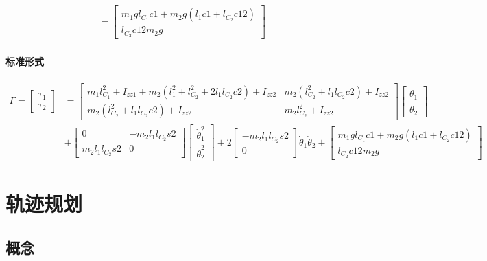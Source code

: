 \documentclass[
12pt, %
a4paper, 
oneside, %
headinclude,footinclude, %
]{scrartcl}
\begin{document}
{\begin{enumerate}
\begin{align*}
&= \begin{bmatrix} m_1 g l_{C_1}c1 + m_2 g(l_1 c1 + l_{C_2}c12) \\ l_{C_2}c12 m_2 g \end{bmatrix}
\end{align*}
\end{enumerate}
\paragraph{标准形式}
\begin{align*}
\Gamma = \begin{bmatrix} \tau_1 \\ \tau_2 \end{bmatrix}
&= \begin{bmatrix} m_1 l_{C_1}^2 + I_{zz1} + m_2(l_1^2 + l_{C_2}^2 + 2l_1 l_{C_2}c2) + I_{zz2} & m_2(l_{C_2}^2 + l_1 l_{C_2}c2) + I_{zz2} \\ m_2(l_{C_2}^2 + l_1 l_{C_2}c2) + I_{zz2} & m_2 l_{C_2}^2 + I_{zz2} \end{bmatrix} \begin{bmatrix} \ddot{\theta}_1 \\ \ddot{\theta}_2 \end{bmatrix} \\  
&+ \begin{bmatrix} 0 & -m_2 l_1 l_{C_2}s2 \\ m_2 l_1 l_{C_2}s2 & 0 \end{bmatrix} \begin{bmatrix} \dot{\theta}_1^2 \\ \dot{\theta}_2^2 \end{bmatrix} + 2\begin{bmatrix} -m_2 l_1 l_{C_2}s2 \\ 0 \end{bmatrix} \dot{\theta}_1 \dot{\theta}_2 + \begin{bmatrix} m_1 g l_{C_1}c1 + m_2 g(l_1 c1 + l_{C_2}c12) \\ l_{C_2}c12 m_2 g \end{bmatrix} 
\end{align*}
}
\section{轨迹规划}
\subsection[概念]{概念}
\end{document}
